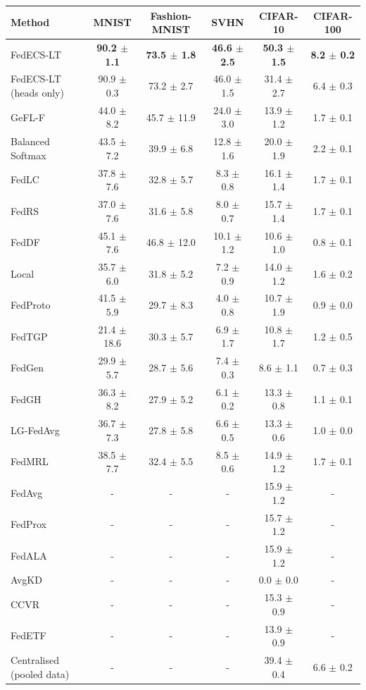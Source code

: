 \begin{tabular}{lccccc}
\toprule
Method & MNIST & Fashion-MNIST & SVHN & CIFAR-10 & CIFAR-100\\
\midrule
FedECS-LT & \textbf{90.2 $\pm$ 1.1} & \textbf{73.5 $\pm$ 1.8} & \textbf{46.6 $\pm$ 2.5} & \textbf{50.3 $\pm$ 1.5} & \textbf{8.2 $\pm$ 0.2}\\
FedECS-LT (heads only) & 90.9 $\pm$ 0.3 & 73.2 $\pm$ 2.7 & 46.0 $\pm$ 1.5 & 31.4 $\pm$ 2.7 & 6.4 $\pm$ 0.3\\
GeFL-F & 44.0 $\pm$ 8.2 & 45.7 $\pm$ 11.9 & 24.0 $\pm$ 3.0 & 13.9 $\pm$ 1.2 & 1.7 $\pm$ 0.1\\
Balanced Softmax & 43.5 $\pm$ 7.2 & 39.9 $\pm$ 6.8 & 12.8 $\pm$ 1.6 & 20.0 $\pm$ 1.9 & 2.2 $\pm$ 0.1\\
FedLC & 37.8 $\pm$ 7.6 & 32.8 $\pm$ 5.7 & 8.3 $\pm$ 0.8 & 16.1 $\pm$ 1.4 & 1.7 $\pm$ 0.1\\
FedRS & 37.0 $\pm$ 7.6 & 31.6 $\pm$ 5.8 & 8.0 $\pm$ 0.7 & 15.7 $\pm$ 1.4 & 1.7 $\pm$ 0.1\\
FedDF & 45.1 $\pm$ 7.6 & 46.8 $\pm$ 12.0 & 10.1 $\pm$ 1.2 & 10.6 $\pm$ 1.0 & 0.8 $\pm$ 0.1\\
Local & 35.7 $\pm$ 6.0 & 31.8 $\pm$ 5.2 & 7.2 $\pm$ 0.9 & 14.0 $\pm$ 1.2 & 1.6 $\pm$ 0.2\\
FedProto & 41.5 $\pm$ 5.9 & 29.7 $\pm$ 8.3 & 4.0 $\pm$ 0.8 & 10.7 $\pm$ 1.9 & 0.9 $\pm$ 0.0\\
FedTGP & 21.4 $\pm$ 18.6 & 30.3 $\pm$ 5.7 & 6.9 $\pm$ 1.7 & 10.8 $\pm$ 1.7 & 1.2 $\pm$ 0.5\\
FedGen & 29.9 $\pm$ 5.7 & 28.7 $\pm$ 5.6 & 7.4 $\pm$ 0.3 & 8.6 $\pm$ 1.1 & 0.7 $\pm$ 0.3\\
FedGH & 36.3 $\pm$ 8.2 & 27.9 $\pm$ 5.2 & 6.1 $\pm$ 0.2 & 13.3 $\pm$ 0.8 & 1.1 $\pm$ 0.1\\
LG-FedAvg & 36.7 $\pm$ 7.3 & 27.8 $\pm$ 5.8 & 6.6 $\pm$ 0.5 & 13.3 $\pm$ 0.6 & 1.0 $\pm$ 0.0\\
FedMRL & 38.5 $\pm$ 7.7 & 32.4 $\pm$ 5.5 & 8.5 $\pm$ 0.6 & 14.9 $\pm$ 1.2 & 1.7 $\pm$ 0.1\\
FedAvg & - & - & - & 15.9 $\pm$ 1.2 & -\\
FedProx & - & - & - & 15.7 $\pm$ 1.2 & -\\
FedALA & - & - & - & 15.9 $\pm$ 1.2 & -\\
AvgKD & - & - & - & 0.0 $\pm$ 0.0 & -\\
CCVR & - & - & - & 15.3 $\pm$ 0.9 & -\\
FedETF & - & - & - & 13.9 $\pm$ 0.9 & -\\
Centralised (pooled data) & - & - & - & 39.4 $\pm$ 0.4 & 6.6 $\pm$ 0.2\\
\bottomrule
\end{tabular}
